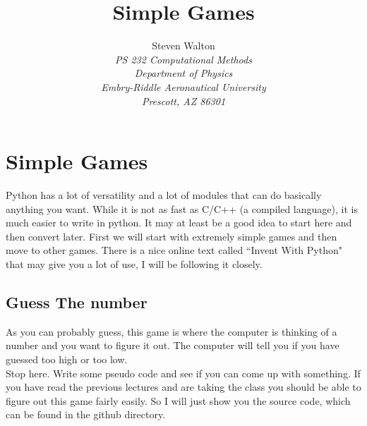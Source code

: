 \documentclass[11pt]{article}   %
\title{Simple Games}
\author{Steven Walton\\     %
\textit{PS 232 Computational Methods}\\
\textit{Department of Physics}\\
\textit{Embry-Riddle Aeronautical University}\\
\textit{Prescott, AZ   86301}}
\begin{document}
\maketitle
\section*{Simple Games}
Python has a lot of versatility and a lot of modules that can do basically anything you want.  While it is not as fast as C/C++ (a compiled language), it is much easier to write in python.  It may at least be a good idea to 
start here and then convert later.  First we will start with extremely simple games and then move to other games.  There is a nice online text called ``Invent With Python" that may give you a lot of use, I will be following it
closely.

\subsection*{Guess The number}
As you can probably guess, this game is where the computer is thinking of a number and you want to figure it out.  The computer will tell you if you have guessed too high or too low.
\\
Stop here.  Write some pseudo code and see if you can come up with something.  If you have read the previous lectures and are taking the class you should be able to figure out this game fairly easily.  So I will just show you the 
source code, which can be found in the github directory.
\end{document}
